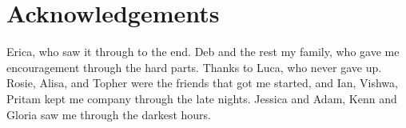 \chapter{Acknowledgements}

Erica, who saw it through to the end.
Deb and the rest my family, who gave me encouragement through the hard parts.
Thanks to Luca, who never gave up.
Rosie, Alisa, and Topher were the friends that got me started,
and Ian, Vishwa, Pritam kept me company through the late nights.
Jessica and Adam, Kenn and Gloria saw me through the darkest hours.

